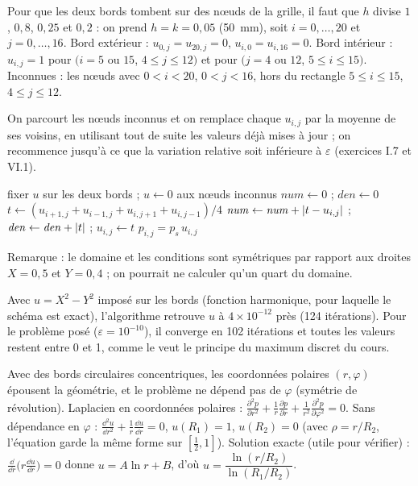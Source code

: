 \Pourquoi Pour que les deux bords tombent sur des nœuds de la grille, il faut
que $h$ divise $1$, $0{,}8$, $0{,}25$ et $0{,}2$ : on prend $h = k = 0{,}05$
(50~mm), soit $i = 0, \dots, 20$ et $j = 0, \dots, 16$.
 Bord extérieur : $u_{0,j} = u_{20,j} = 0$, $u_{i,0} = u_{i,16} = 0$.
 Bord intérieur : $u_{i,j} = 1$ pour $(i = 5$ ou $15$, $4 \le j \le 12)$
et pour $(j = 4$ ou $12$, $5 \le i \le 15)$.
 Inconnues : les nœuds avec $0 < i < 20$, $0 < j < 16$, hors du
rectangle $5 \le i \le 15$, $4 \le j \le 12$.

 On parcourt les nœuds inconnus et on
remplace chaque $u_{i,j}$ par la moyenne de ses voisins, en utilisant tout de
suite les valeurs déjà mises à jour ; on recommence jusqu'à ce que la variation
relative soit inférieure à $\varepsilon$ (exercices I.7 et VI.1).

\begin{algo}
  \State fixer $u$ sur les deux bords ; $u \leftarrow 0$ aux nœuds inconnus
  \Repeat
    \State $\mathit{num} \leftarrow 0$ ; $\mathit{den} \leftarrow 0$
          \State $t \leftarrow (u_{i+1,j} + u_{i-1,j} + u_{i,j+1} + u_{i,j-1})/4$
          \State $\mathit{num} \leftarrow \mathit{num} + \left|t - u_{i,j}\right|$ ; $\mathit{den} \leftarrow \mathit{den} + \left|t\right|$ ; $u_{i,j} \leftarrow t$
        \EndIf
      \EndFor
    \EndFor
  \Print $p_{i,j} = p_s\,u_{i,j}$
\end{algo}
Remarque : le domaine et les conditions sont symétriques par rapport aux droites
$X = 0{,}5$ et $Y = 0{,}4$ ; on pourrait ne calculer qu'un quart du domaine.

\Verif Avec $u = X^2 - Y^2$ imposé sur les bords (fonction harmonique, pour
laquelle le schéma est exact), l'algorithme retrouve $u$ à $4\times 10^{-12}$
près (124 itérations). Pour le problème posé ($\varepsilon = 10^{-10}$), il
converge en 102 itérations et toutes les valeurs restent entre 0 et 1, comme le
veut le principe du maximum discret du cours.

\Pourquoi Avec des bords circulaires concentriques, les coordonnées polaires
$(r, \varphi)$ épousent la géométrie, et le problème ne dépend pas de $\varphi$
(symétrie de révolution).
 Laplacien en coordonnées polaires :
$\frac{\partial^2p}{\partial r^2} + \frac1r\frac{\partial p}{\partial r}
 + \frac1{r^2}\frac{\partial^2p}{\partial\varphi^2} = 0$.
 Sans dépendance en $\varphi$ :
$\frac{\dd^2u}{\dd r^2} + \frac1r\frac{\dd u}{\dd r} = 0$,
$u(R_1) = 1$, $u(R_2) = 0$ (avec $\rho = r/R_2$, l'équation garde la même forme
sur $[\frac12, 1]$).
 Solution exacte (utile pour vérifier) :
$\frac{\dd}{\dd r}\bigl(r\frac{\dd u}{\dd r}\bigr) = 0$ donne
$u = A\ln r + B$, d'où $u = \dfrac{\ln(r/R_2)}{\ln(R_1/R_2)}$.

